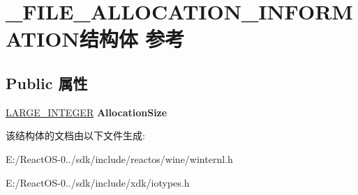 \hypertarget{struct___f_i_l_e___a_l_l_o_c_a_t_i_o_n___i_n_f_o_r_m_a_t_i_o_n}{}\section{\+\_\+\+F\+I\+L\+E\+\_\+\+A\+L\+L\+O\+C\+A\+T\+I\+O\+N\+\_\+\+I\+N\+F\+O\+R\+M\+A\+T\+I\+O\+N结构体 参考}
\label{struct___f_i_l_e___a_l_l_o_c_a_t_i_o_n___i_n_f_o_r_m_a_t_i_o_n}
\subsection*{Public 属性}
\begin{DoxyCompactItemize}
\item 
\mbox{\label{struct___f_i_l_e___a_l_l_o_c_a_t_i_o_n___i_n_f_o_r_m_a_t_i_o_n_a1fbbcddb5eb65cacb95e3d56425dce95}} 
\hyperlink{union___l_a_r_g_e___i_n_t_e_g_e_r}{L\+A\+R\+G\+E\+\_\+\+I\+N\+T\+E\+G\+ER} {\bfseries Allocation\+Size}
\end{DoxyCompactItemize}


该结构体的文档由以下文件生成\+:\begin{DoxyCompactItemize}
\item 
E\+:/\+React\+O\+S-\/0../sdk/include/reactos/wine/winternl.\+h\item 
E\+:/\+React\+O\+S-\/0../sdk/include/xdk/iotypes.\+h\end{DoxyCompactItemize}
